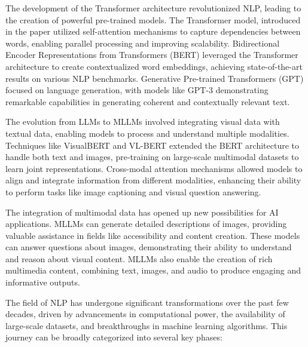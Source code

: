 The development of the Transformer architecture revolutionized NLP, leading to the creation of powerful pre-trained models. The Transformer model, introduced in the paper \cite{vaswani2017attention} utilized self-attention mechanisms to capture dependencies between words, enabling parallel processing and improving scalability. Bidirectional Encoder Representations from Transformers (BERT) leveraged the Transformer architecture to create contextualized word embeddings, achieving state-of-the-art results on various NLP benchmarks. Generative Pre-trained Transformers (GPT) focused on language generation, with models like GPT-3 demonstrating remarkable capabilities in generating coherent and contextually relevant text.

The evolution from LLMs to MLLMs involved integrating visual data with textual data, enabling models to process and understand multiple modalities. Techniques like VisualBERT and VL-BERT extended the BERT architecture to handle both text and images, pre-training on large-scale multimodal datasets to learn joint representations. Cross-modal attention mechanisms allowed models to align and integrate information from different modalities, enhancing their ability to perform tasks like image captioning and visual question answering.

The integration of multimodal data has opened up new possibilities for AI applications. MLLMs can generate detailed descriptions of images, providing valuable assistance in fields like accessibility and content creation. These models can answer questions about images, demonstrating their ability to understand and reason about visual content. MLLMs also enable the creation of rich multimedia content, combining text, images, and audio to produce engaging and informative outputs.

The field of NLP has undergone significant transformations over the past few decades, driven by advancements in computational power, the availability of large-scale datasets, and breakthroughs in machine learning algorithms. This journey can be broadly categorized into several key phases:



